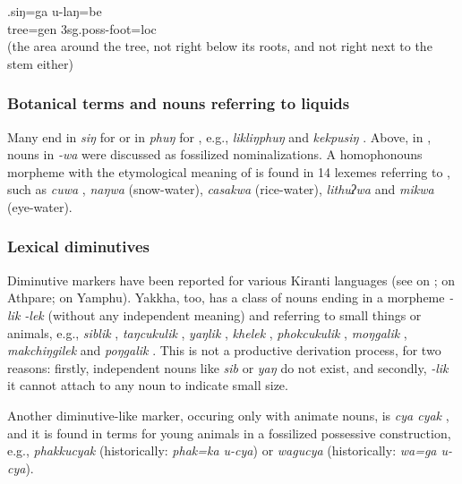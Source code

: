 \exg.siŋ=ga u-laŋ=be\\
tree{\sc =gen} {\sc 3sg.poss-}foot{\sc =loc}\\
 (the area around the tree, not right below its roots, and not right next to the stem either)


\subsubsection{Botanical terms and nouns referring to liquids}

Many  end in \emph{siŋ} for  or in \emph{phuŋ} for , e.g., \emph{likliŋphuŋ}  and \emph{kekpusiŋ} . Above, in , nouns in \emph{-wa} were discussed as fossilized nominalizations. A homophonouns morpheme with the etymological meaning of  is found in 14 lexemes referring to , such as  \emph{cuwa} , \emph{naŋwa}  (snow-water), \emph{casakwa}  (rice-water), \emph{lithuʔwa}  and \emph{mikwa}  (eye-water). 


\subsubsection{Lexical diminutives}

Diminutive markers have been reported for various Kiranti languages (see \citet[67]{Doornenbal2009A-grammar} on ; \citet[95]{Ebert1997A-grammar} on Athpare; \citet[85]{Rutgers1998Yamphu} on Yamphu). Yakkha, too, has a class of nouns ending in a morpheme \emph{-lik \ti -lek} (without any independent meaning) and referring to small things or animals, e.g., \emph{siblik} , \emph{taŋcukulik} , \emph{yaŋlik} , \emph{khelek} , \emph{phokcukulik} , \emph{moŋgalik} , \emph{makchiŋgilek}  and \emph{poŋgalik} . This is not a productive derivation process, for two reasons: firstly, independent nouns like \emph{sib} or \emph{yaŋ} do not exist, and secondly, \emph{-lik} it cannot attach to any noun to indicate small size.

Another diminutive-like marker, occuring only with animate nouns, is \emph{cya \ti cyak} , and it is found in terms for young animals in a fossilized possessive construction, e.g., \emph{phakkucyak}   (historically: \emph{phak=ka u-cya}) or \emph{wagucya}  (historically: \emph{wa=ga u-cya}).

